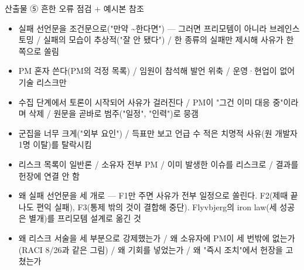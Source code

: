 \begin{frame}[allowframebreaks=1.0]{산출물 ⑤ 흔한 오류 점검 + 예시본 참조}
\small
\par\smallskip{}\nobreak
\begin{itemize}
\item[$\square$]\relax 실패 선언문을 조건문으로("만약 \textasciitilde{}한다면") — 그러면 프리모템이 아니라 브레인스토밍 / 실패의 모습이 추상적("잘 안 됐다") / 한 종류의 실패만 제시해 사유가 한쪽으로 쏠림
\item[$\square$]\relax PM 혼자 쓴다(PM의 걱정 목록) / 임원이 참석해 발언 위축 / 운영·현업이 없어 기술 리스크만
\item[$\square$]\relax 수집 단계에서 토론이 시작되어 사유가 걸러진다 / PM이 "그건 이미 대응 중"이라며 삭제 / 원문을 곧바로 범주("일정", "인력")로 뭉갬
\item[$\square$]\relax 군집을 너무 크게("외부 요인") / 득표만 보고 언급 수 적은 치명적 사유(원 개발자 1명 이탈)를 탈락시킴
\item[$\square$]\relax 리스크 목록이 일반론 / 소유자 전부 PM / 이미 발생한 이슈를 리스크로 / 결과를 헌장에 연결 안 함
\end{itemize}
\par\smallskip{}\nobreak
\begin{itemize}
\item\relax 왜 실패 선언문을 세 개로 — F1만 주면 사유가 전부 일정으로 쏠린다. F2(제때 끝나도 편익 실패), F3(통제 밖의 것이 결합해 중단). Flyvbjerg의 iron law(세 성공은 별개)를 프리모템 설계로 옮긴 것
\item\relax 왜 리스크 서술을 세 부분으로 강제했는가 / 왜 소유자에 PM이 세 번밖에 없는가(RACI 8/26과 같은 그림) / 왜 기회를 넣었는가 / 왜 "즉시 조치"에서 헌장을 고쳤는가
\end{itemize}
\par\smallskip{}\nobreak
{}
\end{frame}

